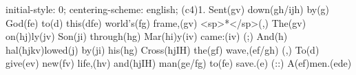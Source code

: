 initial-style: 0;
centering-scheme: english;
(c4)1. Sent(gv) down(gh/ijh) by(g) God(fe) to(d) this(dfe) world's(fg) frame,(gv) <sp>*</sp>(,)
The(gv) on(hj)ly(jv) Son(ji) through(hg) Mar(hi)y(iv) came:(iv) (;)
And(h) hal(hjkv)lowed(j) by(ji) his(hg) Cross(hjIH) the(gf) wave,(ef/gh) (,)
To(d) give(ev) new(fv) life,(hv) and(hjIH) man(ge/fg) to(fe) save.(e) (::)
A(ef)men.(ede)
